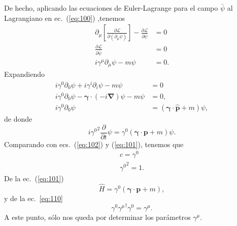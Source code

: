 De hecho, aplicando las ecuaciones de Euler-Lagrange para el campo $\bar{\psi}$ al Lagrangiano en ec.~(\ref{eq:100}) ,tenemos
\begin{align}
  \partial_\mu\left[\frac{\partial\mathcal{L}}{\partial\left(\partial_\mu\bar{\psi}\right)}\right]-\frac{\partial\mathcal{L}}{\partial\bar{\psi}}&=0\nonumber\\
  \frac{\partial\mathcal{L}}{\partial\bar{\psi}}&=0\nonumber\\
  \label{eq:114}
  i\gamma^\mu\partial_\mu\psi-m\psi&=0.
\end{align}
Expandiendo
\begin{align*}
  i\gamma^0\partial_0\psi+i\gamma^i\partial_i\psi-m\psi&=0\\
  i\gamma^0\partial_0\psi-\boldsymbol{\gamma}\cdot(-i\boldsymbol{\nabla})\psi-m\psi&=0,\\
  i\gamma^0\partial_0\psi&=(\boldsymbol{\gamma}\cdot\hat{\mathbf{p}}+m)\psi,
\end{align*}
de donde
\begin{equation}
    i{\gamma^0}^2\frac{\partial}{\partial t}\psi=\gamma^0(\boldsymbol{\gamma}\cdot\mathbf{p}+m)\psi.
\end{equation}
Comparando con ecs.~(\ref{eq:102}) y (\ref{eq:101}), tenemos que
\begin{align}
  c=\gamma^0\nonumber\\
  \label{eq:104}
  {\gamma^0}^2=1.
\end{align}
De la ec.~(\ref{eq:101})
\begin{equation}
  \label{eq:103}
  \hat{H}= \gamma^0(\boldsymbol{\gamma}\cdot\mathbf{p}+m),
\end{equation}
y de la ec.~\eqref{eq:110}
\begin{equation}
  \label{eq:111}
  \gamma^0{\gamma^\mu}^\dagger \gamma^0=\gamma^\mu.
\end{equation}
A este punto, s\'olo nos queda por determinar los par\'ametros $\gamma^\mu$. 

